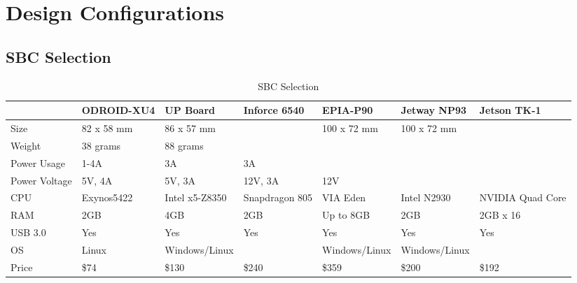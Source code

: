 \appendix

\chapter{Design Configurations}
\section{SBC Selection}
\begin{landscape}
    \begin{table}[h!]
    \caption{SBC Selection}
    \label{table:sbc_selection}
    \centering
    \begin{tabular}{|l|l|l|l|l|l|l|}
        \hline              & ODROID-XU4 & UP Board       & Inforce 6540   & EPIA-P90       & Jetway NP93   & Jetson TK-1      \\ \hline
        Size                & 82 x 58 mm & 86 x 57 mm     &                & 100 x 72 mm    & 100 x 72 mm   &                  \\
        Weight              & 38 grams   & 88 grams       &                &                &               &                  \\
        Power Usage         & 1-4A       & 3A             & 3A             &                &               &                  \\
        Power Voltage       & 5V, 4A     & 5V, 3A         & 12V, 3A        & 12V            &               &                  \\
        CPU                 & Exynos5422 & Intel x5-Z8350 & Snapdragon 805 & VIA Eden       & Intel N2930   & NVIDIA Quad Core \\
        RAM                 & 2GB        & 4GB            & 2GB            & Up to 8GB      & 2GB           & 2GB x 16         \\
        USB 3.0             & Yes        & Yes            & Yes            & Yes            & Yes           & Yes              \\
        OS                  & Linux      & Windows/Linux  &                & Windows/Linux  & Windows/Linux &                  \\
        Price               & \$74       & \$130          & \$240          & \$359          & \$200         & \$192            \\ \hline
    \end{tabular}
    \end{table}
\end{landscape} \par
